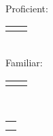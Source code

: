 {		\majorsection{\projects} 
		\projectParasite 
		\projectPytext 
		

	}{ %
	
		
		\noindent\begin{minipage}[t]{0.275\textwidth}
			
			\sidesection{\educationhistory}	\\[0.25\baselineskip]
			\educationUW 
			\educationEvergreen
			\educationHyogo
			
			\sidesection{\courses} \\
			\sidebarcoursework
			
			
			\sidesection{\skills} \\ 
			Proficient:\\[0.25\baselineskip]
			\begin{tabular}{l l}
				\proficientskills
			\end{tabular}\\
			Familiar: \\[0.25\baselineskip]
			\begin{tabular}{l l} 
				\familiarskills
			\end{tabular}

			
			\sidesection{\skillslanguage} \\
			\begin{tabular}{l}
				\skillenglish \\
				\skilljapanese
			\end{tabular} \quarterlinebreak \\
			
			
		\end{minipage}
		\hfill
		\begin{minipage}[t]{0.7\textwidth}
			\majorsection{\experience} 
				\jobexpNPD
				\jobexpGSP
				\jobexpGDIIntern	
		\majorsection{\graduatecoursework} 
		\courseworkML
		\courseworkNLM
		\courseworkNLP

		\majorsection{\projectsawards\vspace{-0.25\baselineskip}} 
		\awardAmplify 
		\awardGoldenTicket 
		\awardParasite
		
		\end{minipage}
		
	}
	
